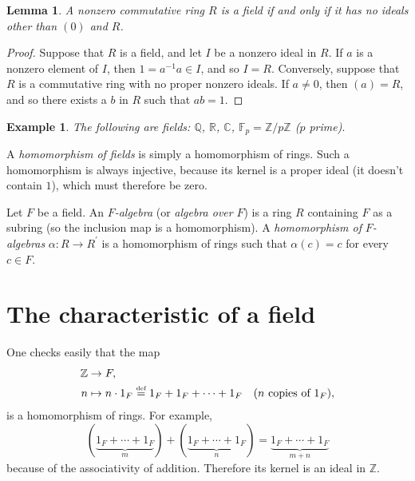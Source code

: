 \documentclass[a4paper,11pt,final,openany]{memoir}
\newtheorem{lemma}[X]{Lemma}
\newtheorem{example}[X]{Example}
\theoremstyle{nonumberplain}
\newtheorem{proof}{Proof.}
\begin{document}
\begin{lemma}
\label{ef1}A nonzero commutative ring $R$ is a field if and only if it has no
ideals other than $(0)$ and $R$.
\end{lemma}

\begin{proof}
Suppose that $R$ is a field, and let $I$ be a nonzero ideal in $R$. If $a$ is
a nonzero element of $I$, then $1=a^{-1}a\in I$, and so $I=R$. Conversely,
suppose that $R$ is a commutative ring with no proper nonzero ideals. If
$a\neq0$, then $(a)=R$, and so there exists a $b$ in $R$ such that $ab=1$.
\end{proof}

\begin{example}
\label{ef2}The following are fields: $\mathbb{Q}$, $\mathbb{R}$, $\mathbb{C}$,
$\mathbb{F}_{p}=\mathbb{Z}/p\mathbb{Z}$ ($p$ prime)$.$
\end{example}

A \emph{homomorphism of fields}%
is simply a homomorphism of rings. Such a homomorphism is always injective,
because its kernel is a proper ideal (it doesn't contain $1$), which must
therefore be zero.

Let $F$ be a field. An $F$\emph{-algebra}%
(or \emph{algebra over }$F$)%
is a ring $R$ containing $F$ as a subring (so the inclusion map is a
homomorphism). A \emph{homomorphism of }$F$\emph{-algebras} $\alpha\colon
R\rightarrow R^{\prime}$%
is a homomorphism of rings such that $\alpha(c)=c$ for every $c\in F$.

\section{The characteristic of a field}

One checks easily that the map
\begin{align*}
  \mathbb{Z}&\rightarrow F,\\
  n&\mapsto n\cdot1_{F}\overset{\textup{{\tiny def}%
}}{=}1_{F}+1_{F}+\cdots+1_{F}\quad(n\text{ copies of }1_{F}),
\end{align*}
is a homomorphism of rings. For example,%
\[
(\underbrace{1_{F}+\cdots+1_{F}}_{m})+(\underbrace{1_{F}+\cdots+1_{F}}%
_{n})=\underbrace{1_{F}+\cdots+1_{F}}_{m+n}%
\]
because of the associativity of addition. Therefore its kernel is an ideal in
$\mathbb{Z}{}$.
\end{document}
